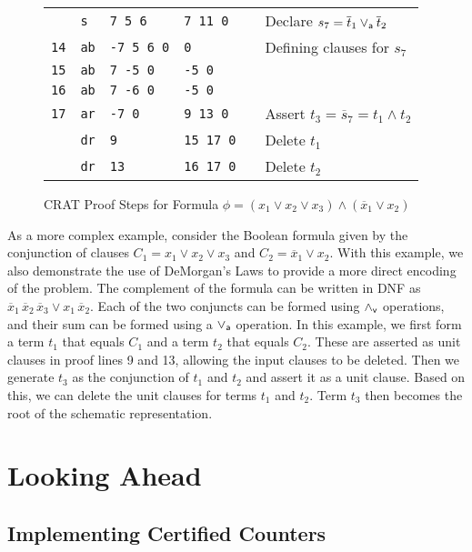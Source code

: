 \documentclass{llncs}
\newcommand{\pand}{\mathbin{\land_{\sf v}}}
\newcommand{\por}{\mathbin{\lor_{\sf a}}}
\newcommand{\obar}[1]{\overline{#1}}
\begin{document}
\begin{figure}
{\begin{tabular}{llllll}
            & {\tt s}   & {\tt 7 5 6}   & {\tt 7 11 0}  & & Declare $s_7 = \obar{t}_1 \por \obar{t}_2$ \\
    {\tt 14} & {\tt ab}  & {\tt -7 5 6 0}  & {\tt 0}    & & Defining clauses for $s_7$ \\ 
    {\tt 15} & {\tt ab}  & {\tt  7 -5 0}    & {\tt -5 0} &  \\  
    {\tt 16} & {\tt ab}  & {\tt  7 -6 0}    & {\tt -5 0} & &  \\
    {\tt 17} & {\tt ar}  & {\tt -7 0}       & {\tt 9 13 0} & & Assert $t_3 = \obar{s}_7 = t_1 \land t_2$ \\
             & {\tt dr}  & {\tt 9}          & {\tt 15 17 0} & & Delete $t_1$\\
             & {\tt dr}  & {\tt 13}         & {\tt 16 17 0} & & Delete $t_2$\\
  \end{tabular}
}  
  \caption{CRAT Proof Steps for Formula $\phi = (x_1 \lor x_2 \lor x_3) \land (\obar{x}_1 \lor x_2)$}
  \label{fig:p2:crat}
\end{figure}

As a more complex example, consider the Boolean formula given by the
conjunction of clauses $C_1 = x_1 \lor x_2 \lor x_3$ and $C_2 =
\obar{x}_1 \lor x_2$.  With this example, we also demonstrate the use
of DeMorgan's Laws to provide a more direct encoding of the problem.
The complement of the formula can be written in DNF as
$\obar{x}_1\,\obar{x}_2\,\obar{x}_3 \lor x_1\,\obar{x}_2$.  Each of
the two conjuncts can be formed using $\pand$ operations, and their
sum can be formed using a $\por$ operation.  In this example, we first
form a term $t_1$ that equals $C_1$ and a term $t_2$ that equals
$C_2$.  These are asserted as unit clauses in proof lines 9 and 13,
allowing the input clauses to be deleted.  Then we generate $t_3$ as
the conjunction of $t_1$ and $t_2$ and assert it as a unit clause.
Based on this, we can delete the unit clauses for terms $t_1$ and
$t_2$.  Term $t_3$ then becomes the root of the schematic representation.





\section{Looking Ahead}

\subsection{Implementing Certified Counters}
\end{document}
